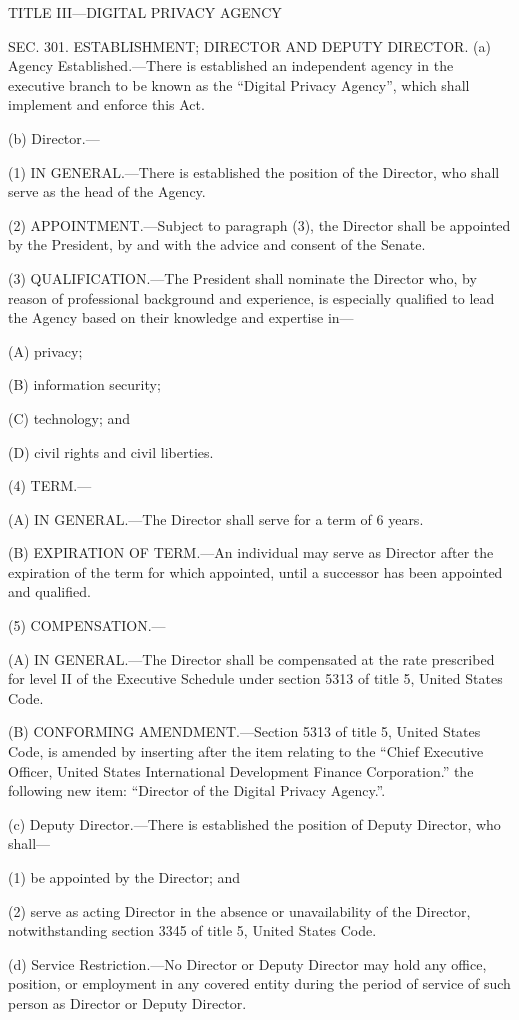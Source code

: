 TITLE III—DIGITAL PRIVACY AGENCY

SEC. 301. ESTABLISHMENT; DIRECTOR AND DEPUTY DIRECTOR.
(a) Agency Established.—There is established an independent agency in the executive branch to be known as the “Digital Privacy Agency”, which shall implement and enforce this Act.

(b) Director.—

(1) IN GENERAL.—There is established the position of the Director, who shall serve as the head of the Agency.

(2) APPOINTMENT.—Subject to paragraph (3), the Director shall be appointed by the President, by and with the advice and consent of the Senate.

(3) QUALIFICATION.—The President shall nominate the Director who, by reason of professional background and experience, is especially qualified to lead the Agency based on their knowledge and expertise in—

(A) privacy;

(B) information security;

(C) technology; and

(D) civil rights and civil liberties.

(4) TERM.—

(A) IN GENERAL.—The Director shall serve for a term of 6 years.

(B) EXPIRATION OF TERM.—An individual may serve as Director after the expiration of the term for which appointed, until a successor has been appointed and qualified.

(5) COMPENSATION.—

(A) IN GENERAL.—The Director shall be compensated at the rate prescribed for level II of the Executive Schedule under section 5313 of title 5, United States Code.

(B) CONFORMING AMENDMENT.—Section 5313 of title 5, United States Code, is amended by inserting after the item relating to the “Chief Executive Officer, United States International Development Finance Corporation.” the following new item: “Director of the Digital Privacy Agency.”.

(c) Deputy Director.—There is established the position of Deputy Director, who shall—

(1) be appointed by the Director; and

(2) serve as acting Director in the absence or unavailability of the Director, notwithstanding section 3345 of title 5, United States Code.

(d) Service Restriction.—No Director or Deputy Director may hold any office, position, or employment in any covered entity during the period of service of such person as Director or Deputy Director.

